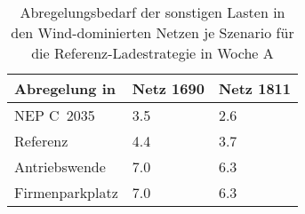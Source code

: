 {
\renewcommand{\arraystretch}{1.2}%
\begin{table}[H]
	\begin{center}
		\caption{Abregelungsbedarf der sonstigen Lasten in den Wind-dominierten Netzen je Szenario für die Referenz-Ladestrategie in Woche A}
		\begin{tabu} to 0.6\textwidth {X[1.5] X[1, r] X[1, r]}
			\toprule
			Abregelung in   \si{\mwh}    & Netz \num{1690} & Netz \num{1811} \\ \midrule
			NEP C~\num{2035}             & \num{3.5}       & \num{2.6}       \\
			Referenz                     & \num{4.4}       & \num{3.7}       \\
			Antriebswende                & \num{7.0}       & \num{6.3}       \\
			\glqq Firmenparkplatz\grqq{} & \num{7.0}       & \num{6.3}       \\ \bottomrule
		\end{tabu}
		\label{tab:wind_dominated_week_a_load_cur}
	\end{center}
	\vspace{-3mm}%
\end{table}
}